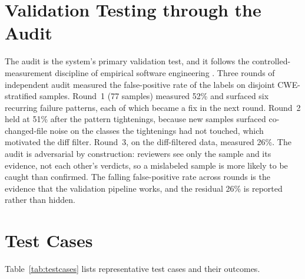 \section{Validation Testing through the Audit}

The audit is the system's primary validation test, and it follows the
controlled-measurement discipline of empirical software engineering
\cite{wohlin}. Three rounds of independent audit measured the false-positive
rate of the labels on disjoint CWE-stratified samples. Round~1 (77 samples) measured 52\% and surfaced six recurring failure
patterns, each of which became a fix in the next round. Round~2 held at 51\%
after the pattern tightenings, because new samples surfaced co-changed-file noise
on the classes the tightenings had not touched, which motivated the diff filter.
Round~3, on the diff-filtered data, measured 26\%. The audit is adversarial by
construction: reviewers see only the sample and its evidence, not each other's
verdicts, so a mislabeled sample is more likely to be caught than confirmed. The
falling false-positive rate across rounds is the evidence that the validation
pipeline works, and the residual 26\% is reported rather than hidden.

\section{Test Cases}

Table~\ref{tab:testcases} lists representative test cases and their outcomes.

